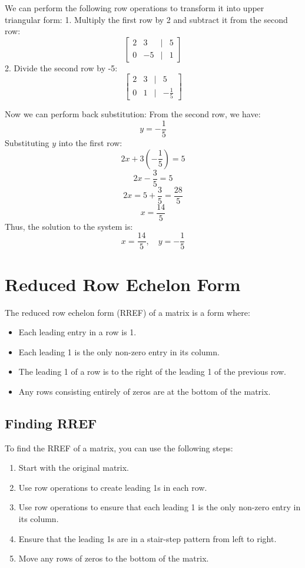 \documentclass{article}
\begin{document}
We can perform the following row operations to transform it into upper triangular form:
1. Multiply the first row by 2 and subtract it from the second row:
\[  \begin{bmatrix}
    2 & 3 & | & 5 \\
    0 & -5 & | & 1
\end{bmatrix} \]
2. Divide the second row by -5:
\[  \begin{bmatrix}
    2 & 3 & | & 5 \\
    0 & 1 & | & -\frac{1}{5}
\end{bmatrix} \]

Now we can perform back substitution:
From the second row, we have:
\[ y = -\frac{1}{5} \]
Substituting \( y \) into the first row:
\[ 2x + 3\left(-\frac{1}{5}\right) = 5 \]
\[ 2x - \frac{3}{5} = 5 \]
\[ 2x = 5 + \frac{3}{5} = \frac{28}{5} \]
\[ x = \frac{14}{5} \]
Thus, the solution to the system is:
\[ x = \frac{14}{5}, \quad y = -\frac{1}{5} \]


\section*{Reduced Row Echelon Form}
The reduced row echelon form (RREF) of a matrix is a form where:
\begin{itemize}
    \item Each leading entry in a row is 1.
    \item Each leading 1 is the only non-zero entry in its column.
    \item The leading 1 of a row is to the right of the leading 1 of the previous row.
    \item Any rows consisting entirely of zeros are at the bottom of the matrix.
\end{itemize}

\subsection*{Finding RREF}
To find the RREF of a matrix, you can use the following steps:
\begin{enumerate}
    \item Start with the original matrix.
    \item Use row operations to create leading 1s in each row.
    \item Use row operations to ensure that each leading 1 is the only non-zero entry in its column.
    \item Ensure that the leading 1s are in a stair-step pattern from left to right.
    \item Move any rows of zeros to the bottom of the matrix.
\end{enumerate}
\end{document}
